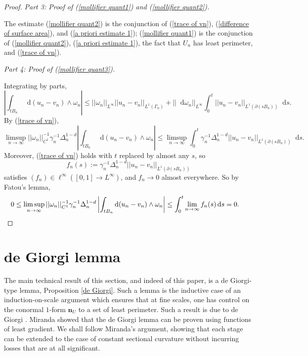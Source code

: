 \documentclass[reqno,10pt]{amsart}
\newcommand*\dif{\mathop{}\!\mathrm{d}}
\newcommand{\normal}{\mathbf n}
\theoremstyle{definition}
\newcommand{\proofpart}[2]{%
  \par
  \addvspace{\medskipamount}%
  \noindent\emph{Part #1: #2.}
}
\numberwithin{equation}{section}
\begin{document}
\begin{proof}
\proofpart{3}{Proof of (\ref{mollifier quant1}) and (\ref{mollifier quant2})}
The estimate (\ref{mollifier quant2}) is the conjunction of (\ref{trace of vn}), (\ref{difference of surface area}), and (\ref{a priori estimate 1});
(\ref{mollifier quant1}) is the conjunction of (\ref{mollifier quant2}), (\ref{a priori estimate 1}), the fact that $U_n$ has least perimeter, and (\ref{trace of vn}).

\proofpart{4}{Proof of (\ref{mollifier quant3})}
Integrating by parts,
$$\left|\int_{tB_n} \dif (u_n - v_n) \wedge \omega_n\right| \leq ||\omega_n||_{L^\infty} ||u_n - v_n||_{L^1(\Gamma_n)} + ||\dif \omega_n||_{L^\infty} \int_0^t ||u_n - v_n||_{L^1(\partial(sB_n))} \dif s.$$
By (\ref{trace of vn}),
$$\limsup_{n \to \infty} ||\omega_n||_{C^1}^{-1} \gamma_n^{-1} \Delta_n^{1 - d} \left|\int_{tB_n} \dif(u_n - v_n) \wedge \omega_n\right| \leq \limsup_{n \to \infty} \int_0^t \gamma_n^{-1} \Delta_n^{1 - d} ||u_n - v_n||_{L^1(\partial(sB_n))} \dif s.$$
Moreover, (\ref{trace of vn}) holds with $t$ replaced by almost any $s$, so
$$f_n(s) := \gamma_n^{-1} \Delta_n^{1 - d} ||u_n - v_n||_{L^1(\partial(sB_n))}$$
satisfies $(f_n) \in \ell^\infty([0, 1] \to L^\infty)$, and $f_n \to 0$ almost everywhere.
So by Fatou's lemma,
\begin{align*}
0 \leq \limsup_{n \to \infty} ||\omega_n||_{C^1}^{-1} \gamma_n^{-1} \Delta_n^{1 - d} \left|\int_{tB_n} \dif(u_n - v_n) \wedge \omega_n\right| &\leq \int_0^t \lim_{n \to \infty} f_n(s) \dif s = 0. \qedhere
\end{align*}
\end{proof}


\section{de Giorgi lemma}\label{Plateau section}
The main technical result of this section, and indeed of this paper, is a de Giorgi-type lemma, Proposition \ref{de Giorgi}.
Such a lemma is the inductive case of an induction-on-scale argument which ensures that at fine scales, one has control on the conormal $1$-form $\normal_U$ to a set of least perimeter.
Such a result is due to de Giorgi \cite{deGiorgi61}. Miranda \cite{Miranda64, Miranda66} showed that the de Giorgi lemma can be proven using functions of least gradient.
We shall follow Miranda's argument, showing that each stage can be extended to the case of constant sectional curvature without incurring losses that are at all significant.
\end{document}
